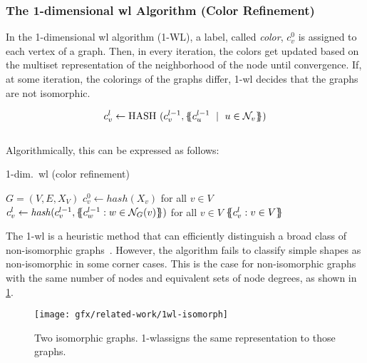 \subsubsection{The 1-dimensional \acs*{wl} Algorithm (Color Refinement)}
In the 1-dimensional \ac{wl} algorithm (1-WL), a label, called \emph{color}, $c_{v}^{0}$ is assigned to each vertex of a graph.
Then, in every iteration, the colors get updated based on the multiset representation of the neighborhood of the node until convergence. If, at some iteration, the colorings of the graphs differ, 1-\ac{wl} decides that the graphs are not isomorphic.

\begin{align*}
    c_{v}^{l} \leftarrow \mathrm{HASH}\ (c_{v}^{l-1}, \ldblbrace c_{u}^{l-1}\ \mid \ u \in \mathcal{N}_{v} \rdblbrace)
\end{align*}
\\

Algorithmically, this can be expressed as follows:
\begin{algorithm}[H]
    \caption{1-dim.\ \ac{wl} (color refinement)}
    \begin{algorithmic}[1]
        \Require $G = (V,E,X_{V})$
        \State $c_{v}^{0} \gets \mathit{hash}(X_{v})$ for all $v \in V$
        \Repeat
        \State $c_{v}^{l} \gets \mathit{hash}(c_{v}^{l-1}, \ldblbrace c_{w}^{l-1}: w \in \mathcal N_{G}(v)\rdblbrace)$ for all $v \in V$
        \State \Return $\ldblbrace c_{v}^l : v \in V \rdblbrace$
    \end{algorithmic}
\end{algorithm}

The 1-\acs{wl} is a heuristic method that can efficiently distinguish a broad class of non-isomorphic graphs~\cite{Babai1979}.
However, the algorithm fails to classify simple shapes as non-isomorphic in some corner cases.
This is the case for non-isomorphic graphs with the same number of nodes and equivalent sets of node degrees, as shown in \cref*{fig:related:1-wl-indistinguishable}.

\begin{figure}[H]
    \centering
    \texttt{[image: gfx/related-work/1wl-isomorph]}
    \caption{Two isomorphic graphs. 1-\ac{wl}assigns the same representation to those graphs.}\label{fig:related:1-wl-indistinguishable}
\end{figure}

